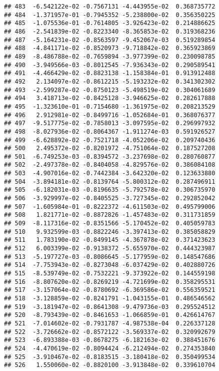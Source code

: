\documentclass[
]{article}
\begin{document}
\begin{verbatim}
## 483  -6.542122e-02 -0.7567131 -4.443955e-02  0.368735772
## 484  -1.371957e-01 -0.7945352 -5.238800e-02  0.356350225
## 485  -1.075536e-01 -0.7614805 -3.926423e-02  0.214886625
## 486  -2.541839e-02 -0.8223340 -8.365853e-02  0.319368236
## 487  -5.164231e-02 -0.8563597 -9.452067e-03  0.519289854
## 488  -4.841171e-02 -0.8520973 -9.718842e-02  0.365923869
## 489  -8.486788e-02 -0.7659894 -3.977399e-02  0.230098785
## 490  -3.949566e-03 -0.8012545 -7.936343e-02  0.290589541
## 491  -4.466429e-02 -0.8823138 -1.158384e-01  0.913912488
## 492   2.134097e-02 -0.8612215 -5.193232e-02  0.341302302
## 493  -2.599287e-02 -0.8750123 -5.498519e-02  0.304061689
## 494   3.418713e-02 -0.8425128 -3.946625e-02  0.282617888
## 495  -1.323610e-01 -0.7154680 -1.361975e-02  0.208213529
## 496   2.912981e-02 -0.8499716 -1.052684e-01  0.368076377
## 497  -9.517775e-02 -0.7858013 -3.097595e-02  0.296997932
## 498  -8.027936e-02 -0.8064367 -1.911274e-03  0.591926527
## 499  -6.628892e-02 -0.7521718 -4.052206e-02  0.209740436
## 500   2.495372e-02 -0.8201972 -4.751064e-02  0.187527208
## 501  -6.749253e-03 -0.8394572 -3.237698e-02  0.280760877
## 502  -2.497378e-02 -0.8404058 -4.829576e-02  0.386084108
## 503  -4.907016e-02 -0.7442384 -3.642320e-02  0.123633880
## 504  -3.894181e-02 -0.8139764 -5.800312e-02  0.287496911
## 505  -6.182031e-03 -0.8196635 -5.792578e-02  0.306735970
## 506  -3.929997e-02 -0.8405525 -3.727345e-02  0.292852042
## 507  -1.605984e-01 -0.8222372 -4.611503e-02  0.495799006
## 508   1.821771e-02 -0.8872826 -1.457483e-02  0.311731859
## 509  -8.117316e-02 -0.8351566 -5.170452e-02  0.405059783
## 510   9.932599e-03 -0.8822246 -3.397413e-02  0.385058829
## 511   1.783190e-02 -0.8499145 -4.367878e-02  0.371423623
## 512   6.003399e-02 -0.9138372 -5.655970e-02  0.444323987
## 513  -5.197727e-03 -0.8086645 -5.177959e-02  0.148547686
## 514  -7.753943e-02 -0.8273048 -6.037429e-02  0.402880726
## 515  -8.539749e-02 -0.7532221 -9.373922e-02  0.144559198
## 516  -8.807620e-02 -0.8269219 -4.721699e-02  0.358295531
## 517  -3.157064e-02 -0.8780692 -6.369586e-02  0.556359521
## 518  -3.128859e-02 -0.8241791 -1.043155e-01  0.486546562
## 519  -3.181947e-02 -0.8641308 -9.479736e-03  0.295524512
## 520  -8.793439e-02 -0.8461653 -1.066859e-01  0.426614767
## 521  -7.014602e-02 -0.7931787 -4.987538e-04  0.226337128
## 522  -3.726662e-02 -0.8572122 -3.569337e-02  0.320992679
## 523  -6.893388e-03 -0.8678275 -6.182163e-02  0.388451676
## 524  -4.470619e-02 -0.8094424 -6.212494e-02  0.274353840
## 525  -3.910467e-02 -0.8183515 -3.180418e-02  0.350499534
## 526   1.550060e-02 -0.8820100 -3.913848e-02  0.339610704

\end{verbatim}
\end{document}
